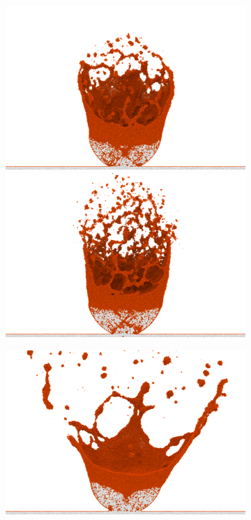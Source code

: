 		\begin{figure}[!ht]
			\centering
			\begin{subfigure}{0.49\textwidth}
				\centering
				\includegraphics[width=\textwidth]{chapter/main/single/img/power_calibration/v10_p80_t1250.png}
				\includegraphics[width=\textwidth]{chapter/main/single/img/power_calibration/v5_p50_t1250.png}
			\end{subfigure}
			\begin{subfigure}{0.49\textwidth}
				\centering
				\includegraphics[width=\textwidth]{chapter/main/single/img/power_calibration/v10_p80_t3000.png}

\end{subfigure}
\end{figure}
